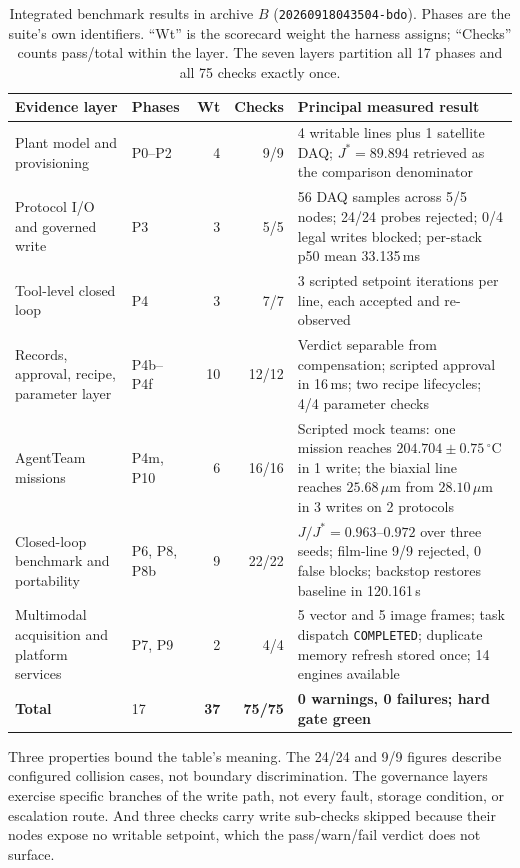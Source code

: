 \begin{table}[!tb]
\centering
\caption{Integrated benchmark results in archive $B$
(\texttt{20260918043504-bdo}). Phases are the suite's own identifiers. ``Wt'' is
the scorecard weight the harness assigns; ``Checks'' counts pass/total within
the layer. The seven layers partition all 17 phases and all 75 checks exactly
once.}
\label{tab:layers}
\scriptsize
\setlength{\tabcolsep}{4pt}
\begin{tabular}{@{}p{}p{}rrp{}@{}}
\toprule
Evidence layer & Phases & Wt & Checks & Principal measured result \\
\midrule
Plant model and provisioning & P0--P2 & 4 & 9/9 &
4 writable lines plus 1 satellite DAQ; $J^{*}=89.894$ retrieved as the comparison
denominator \\
Protocol I/O and governed write & P3 & 3 & 5/5 &
56 DAQ samples across 5/5 nodes; 24/24 probes rejected; 0/4 legal writes blocked;
per-stack p50 mean 33.135\,ms \\
Tool-level closed loop & P4 & 3 & 7/7 &
3 scripted setpoint iterations per line, each accepted and re-observed \\
Records, approval, recipe, parameter layer & P4b--P4f & 10 & 12/12 &
Verdict separable from compensation; scripted approval in 16\,ms; two recipe
lifecycles; 4/4 parameter checks \\
AgentTeam missions & P4m, P10 & 6 & 16/16 &
Scripted mock teams: one mission reaches $204.704\pm0.75\,^\circ$C in 1 write;
the biaxial line reaches $25.68\,\mu$m from $28.10\,\mu$m in 3 writes on 2
protocols \\
Closed-loop benchmark and portability & P6, P8, P8b & 9 & 22/22 &
$J/J^{*}=0.963$--$0.972$ over three seeds; film-line 9/9 rejected, 0 false
blocks; backstop restores baseline in 120.161\,s \\
Multimodal acquisition and platform services & P7, P9 & 2 & 4/4 &
5 vector and 5 image frames; task dispatch \texttt{COMPLETED}; duplicate memory
refresh stored once; 14 engines available \\
\midrule
\textbf{Total} & 17 & \textbf{37} & \textbf{75/75} &
\textbf{0 warnings, 0 failures; hard gate green} \\
\bottomrule
\end{tabular}
\end{table}

Three properties bound the table's meaning. The 24/24 and 9/9 figures describe configured collision cases, not boundary
discrimination. The governance layers
exercise specific branches of the write path, not every fault, storage condition, or
escalation route. And three checks carry write sub-checks skipped because their nodes expose no writable
setpoint, which the pass/warn/fail verdict does not surface.

